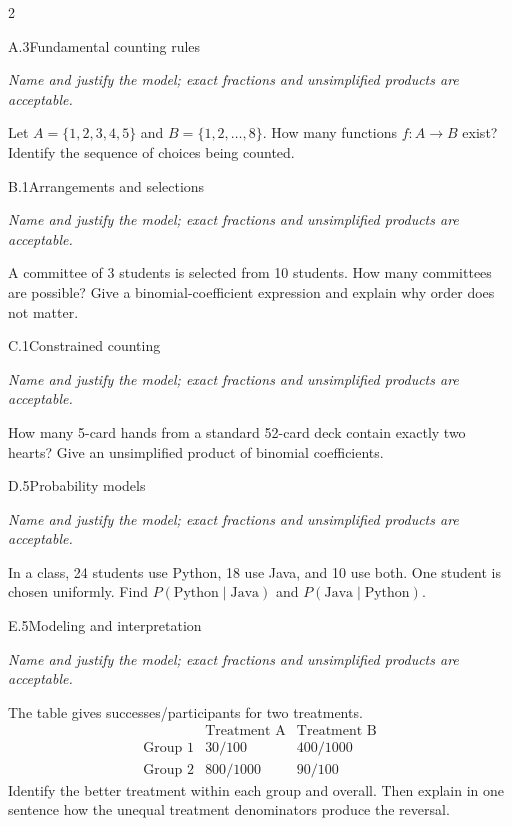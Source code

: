 \documentclass[9pt]{extarticle}
\begin{document}
\begin{multicols}{2}
\begin{CoreProblem}{A.3}{Fundamental counting rules}
{\scriptsize\textit{Name and justify the model; exact fractions and unsimplified products are acceptable.}\par}
Let $A=\{1,2,3,4,5\}$ and $B=\{1,2,\ldots,8\}$. How many functions
    $f:A\to B$ exist? Identify the sequence of choices being counted.
\end{CoreProblem}
\begin{CoreProblem}{B.1}{Arrangements and selections}
{\scriptsize\textit{Name and justify the model; exact fractions and unsimplified products are acceptable.}\par}
A committee of 3 students is selected from 10 students. How many
    committees are possible? Give a binomial-coefficient expression and explain
    why order does not matter.
\end{CoreProblem}
\begin{CoreProblem}{C.1}{Constrained counting}
{\scriptsize\textit{Name and justify the model; exact fractions and unsimplified products are acceptable.}\par}
How many 5-card hands from a standard 52-card deck contain exactly
    two hearts? Give an unsimplified product of binomial coefficients.
\end{CoreProblem}
\columnbreak
\begin{CoreProblem}{D.5}{Probability models}
{\scriptsize\textit{Name and justify the model; exact fractions and unsimplified products are acceptable.}\par}
In a class, 24 students use Python, 18 use Java, and 10 use both.
    One student is chosen uniformly. Find
    $P(\text{Python}\mid\text{Java})$ and
    $P(\text{Java}\mid\text{Python})$.
\end{CoreProblem}
\begin{CoreProblem}{E.5}{Modeling and interpretation}
{\scriptsize\textit{Name and justify the model; exact fractions and unsimplified products are acceptable.}\par}
The table gives successes/participants for two treatments.
    \[
    \begin{array}{c|cc}
      &\text{Treatment A}&\text{Treatment B}\\\hline
      \text{Group 1}&30/100&400/1000\\
      \text{Group 2}&800/1000&90/100
    \end{array}
    \]
    Identify the better treatment within each group and overall. Then explain in
    one sentence how the unequal treatment denominators produce the reversal.
\end{CoreProblem}
\end{multicols}
\end{document}

